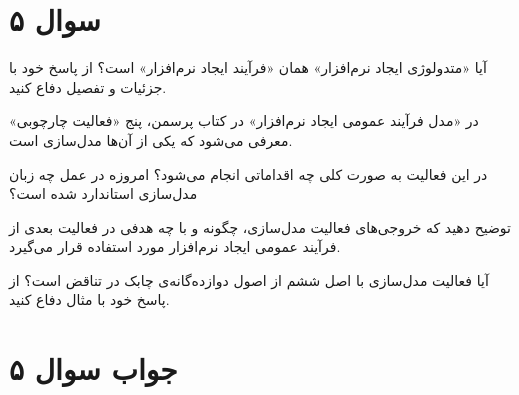 \section*{سوال ۵}

	آیا «متدولوژی ایجاد نرم‌افزار» همان «فرآیند ایجاد نرم‌افزار» است؟ از پاسخ خود با جزئیات و تفصیل دفاع کنید.
	
	در «مدل فرآیند عمومی ایجاد نرم‌افزار» در کتاب پرسمن، پنج «فعالیت چارچوبی» معرفی می‌شود که یکی از آن‌ها مدل‌سازی است.
	
	در این فعالیت به صورت کلی چه اقداماتی انجام می‌شود؟ امروزه در عمل چه زبان مدل‌سازی استاندارد شده است؟
	
	توضیح دهید که خروجی‌های فعالیت مدل‌سازی، چگونه و با چه هدفی در فعالیت بعدی از فرآیند عمومی ایجاد نرم‌افزار مورد استفاده قرار می‌گیرد.
	
	آیا فعالیت مدل‌سازی با اصل ششم از اصول دوازده‌گانه‌ی چابک در تناقض است؟ از پاسخ خود با مثال دفاع کنید.


\section*{جواب سوال ۵}

